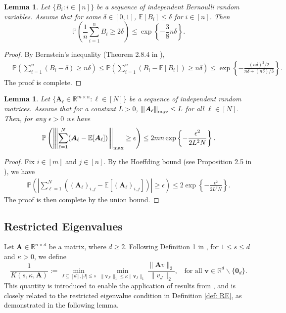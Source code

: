 \documentclass[aos,preprint]{imsart}
\theoremstyle{plain}
\newtheorem{lemma}[theorem]{Lemma}
\theoremstyle{definition}
\newcommand{\bd}[1]{\boldsymbol{#1}}
\newcommand{\op}[1]{{\left\vert\kern-0.25ex\left\vert\kern-0.25ex\left\vert #1\right\vert\kern-0.25ex\right\vert\kern-0.25ex\right\vert}}
\newcommand{\mR}{\mathbb{R}}
\newcommand{\bA}{\boldsymbol{A}}
\newcommand{\bv}{\boldsymbol{v}}
\newcommand{\Exp}{\mathbb{E}}
\newcommand{\Pro}{\mathbb{P}}
\begin{document}
\begin{appendix}
\begin{lemma}\label{lemma: concentration inequality of bernoulli}
Let $\{B_i: i\in[n]\}$ be a sequence of independent Bernoulli random variables. Assume that for some $\delta \in [0,1]$, $\Exp[B_i] \leq \delta$ for $i \in [n]$. Then
$$
\Pro\left(\frac{1}{n}\sum_{i=1}^n B_i\ge 2\delta \right)\le \exp\left\{-\frac{3}{8}n\delta\right\}.
$$
\end{lemma}
\begin{proof}
By Bernstein's inequality (Theorem 2.8.4 in \cite{vershynin2018high}),
\begin{align*} 
&\Pro\left(\sum_{i=1}^n \left(B_i-\delta \right)\ge n\delta \right)  \le  \Pro\left(\sum_{i=1}^n (B_i-\Exp[B_i]) \ge n\delta \right)  \leq \exp\left\{-\frac{(n\delta)^2/2}{n\delta+(n\delta)/3} \right\}.
\end{align*}
The proof is complete.
\end{proof}

\begin{lemma} \label{lemma: max inequality of bounded mat}
Let $\{\bA_{\ell} \in\mR^{m\times n}: \ell \in[N]\}$ be a sequence of independent random matrices. Assume that for a constant $L>0$,  $\op{\bA_{\ell}}_{\textup{max}}\le L$ for all $\ell \in[N]$. Then, for any $\epsilon>0$ we have
$$\Pro\left(\op{\sum_{\ell=1}^N (\bA_\ell -\Exp[\bA_{\ell}]) }_{\textup{max}}\ge \epsilon \right) \le 2mn\exp\left\{-\frac{\epsilon^2}{2 L^2 N} \right\}.$$
\end{lemma}
\begin{proof} Fix $i \in [m]$ and $j \in [n]$. 
By the Hoeffding bound (see Proposition 2.5 in \cite{wainwright2019high}), we have
\begin{align*}
    \Pro\left(\left|\sum_{\ell=1}^N ((\bA_{\ell})_{i,j} -\Exp[(\bA_{\ell})_{i,j}]) \right| \ge \epsilon \right) \le 2 \exp\left\{-\frac{\epsilon^2}{2 L^2 N} \right\}.
\end{align*}
The proof is then complete by the union bound.
\end{proof}





\subsection{Restricted Eigenvalues}
Let $\bA \in \mR^{n\times d}$ be a matrix, where $d \geq 2$. Following Definition 1 in \cite{pmlr-v23-rudelson12}, for $1 \leq s \leq d$ and $\kappa > 0$, we define
\begin{equation}\label{eq: K_RE}
    \frac{1}{K(s, \kappa, \bA)} := \min_{J \subseteq [d], |J|\le s}\min_{\|\bv_{J^c}\|_1 \le \kappa\|\bv_J\|_1} \frac{\|\bA v\|_2}{\|v_J\|_2}, \;\;\text{ for all } \bv\in\mR^d\backslash\{\bd{0}_d\}.
\end{equation}
This quantity is introduced to enable the application of results from \cite{pmlr-v23-rudelson12}, and is closely related to the restricted eigenvalue condition in Definition \ref{def: RE}, as demonstrated in the following lemma.


\end{appendix}
\end{document}
